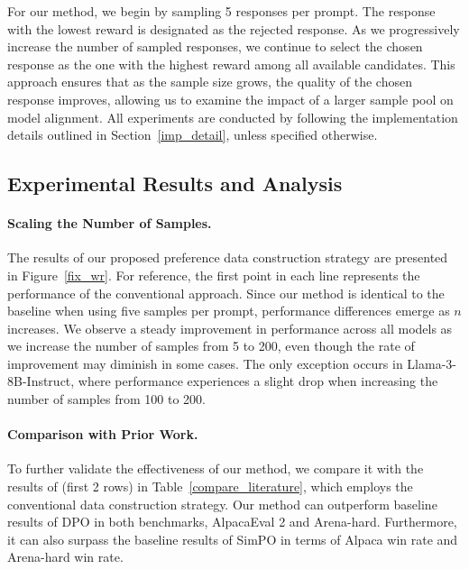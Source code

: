 For our method, we begin by sampling 5 responses per prompt. 
The response with the lowest reward is designated as the rejected response. 
As we progressively increase the number of sampled responses, we continue to select the chosen response as the one with the highest reward among all available candidates. 
This approach ensures that as the sample size grows, the quality of the chosen response improves, allowing us to examine the impact of a larger sample pool on model alignment. 
All experiments are conducted by following the implementation details outlined in Section~\ref{imp_detail}, unless specified otherwise.  

\subsection{Experimental Results and Analysis}

\paragraph{Scaling the Number of Samples.}  
The results of our proposed preference data construction strategy are presented in Figure~\ref{fix_wr}. 
For reference, the first point in each line represents the performance of the conventional approach. 
Since our method is identical to the baseline when using five samples per prompt, performance differences emerge as \( n \) increases. 
We observe a steady improvement in performance across all models as we increase the number of samples from 5 to 200, even though the rate of improvement may diminish in some cases. 
The only exception occurs in Llama-3-8B-Instruct, where performance experiences a slight drop when increasing the number of samples from 100 to 200.





\paragraph{Comparison with Prior Work.}  
To further validate the effectiveness of our method, we compare it with the results of \citet{meng2024simpo} (first 2 rows) in Table~\ref{compare_literature}, which employs the conventional data construction strategy.
Our method can outperform baseline results of DPO in both benchmarks, AlpacaEval 2 and Arena-hard.
Furthermore, it can also surpass the baseline results of SimPO in terms of Alpaca win rate and Arena-hard win rate.  

